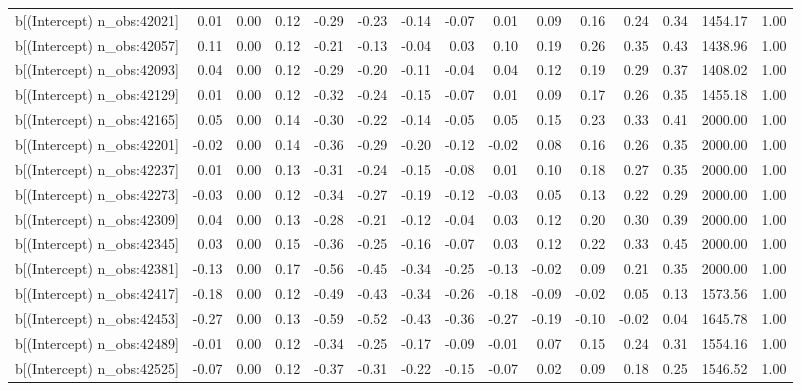 \begin{table}[ht]
\begin{tabular}{rrrrrrrrrrrrrrr}
  b[(Intercept) n\_obs:42021] & 0.01 & 0.00 & 0.12 & -0.29 & -0.23 & -0.14 & -0.07 & 0.01 & 0.09 & 0.16 & 0.24 & 0.34 & 1454.17 & 1.00 \\ 
  b[(Intercept) n\_obs:42057] & 0.11 & 0.00 & 0.12 & -0.21 & -0.13 & -0.04 & 0.03 & 0.10 & 0.19 & 0.26 & 0.35 & 0.43 & 1438.96 & 1.00 \\ 
  b[(Intercept) n\_obs:42093] & 0.04 & 0.00 & 0.12 & -0.29 & -0.20 & -0.11 & -0.04 & 0.04 & 0.12 & 0.19 & 0.29 & 0.37 & 1408.02 & 1.00 \\ 
  b[(Intercept) n\_obs:42129] & 0.01 & 0.00 & 0.12 & -0.32 & -0.24 & -0.15 & -0.07 & 0.01 & 0.09 & 0.17 & 0.26 & 0.35 & 1455.18 & 1.00 \\ 
  b[(Intercept) n\_obs:42165] & 0.05 & 0.00 & 0.14 & -0.30 & -0.22 & -0.14 & -0.05 & 0.05 & 0.15 & 0.23 & 0.33 & 0.41 & 2000.00 & 1.00 \\ 
  b[(Intercept) n\_obs:42201] & -0.02 & 0.00 & 0.14 & -0.36 & -0.29 & -0.20 & -0.12 & -0.02 & 0.08 & 0.16 & 0.26 & 0.35 & 2000.00 & 1.00 \\ 
  b[(Intercept) n\_obs:42237] & 0.01 & 0.00 & 0.13 & -0.31 & -0.24 & -0.15 & -0.08 & 0.01 & 0.10 & 0.18 & 0.27 & 0.35 & 2000.00 & 1.00 \\ 
  b[(Intercept) n\_obs:42273] & -0.03 & 0.00 & 0.12 & -0.34 & -0.27 & -0.19 & -0.12 & -0.03 & 0.05 & 0.13 & 0.22 & 0.29 & 2000.00 & 1.00 \\ 
  b[(Intercept) n\_obs:42309] & 0.04 & 0.00 & 0.13 & -0.28 & -0.21 & -0.12 & -0.04 & 0.03 & 0.12 & 0.20 & 0.30 & 0.39 & 2000.00 & 1.00 \\ 
  b[(Intercept) n\_obs:42345] & 0.03 & 0.00 & 0.15 & -0.36 & -0.25 & -0.16 & -0.07 & 0.03 & 0.12 & 0.22 & 0.33 & 0.45 & 2000.00 & 1.00 \\ 
  b[(Intercept) n\_obs:42381] & -0.13 & 0.00 & 0.17 & -0.56 & -0.45 & -0.34 & -0.25 & -0.13 & -0.02 & 0.09 & 0.21 & 0.35 & 2000.00 & 1.00 \\ 
  b[(Intercept) n\_obs:42417] & -0.18 & 0.00 & 0.12 & -0.49 & -0.43 & -0.34 & -0.26 & -0.18 & -0.09 & -0.02 & 0.05 & 0.13 & 1573.56 & 1.00 \\ 
  b[(Intercept) n\_obs:42453] & -0.27 & 0.00 & 0.13 & -0.59 & -0.52 & -0.43 & -0.36 & -0.27 & -0.19 & -0.10 & -0.02 & 0.04 & 1645.78 & 1.00 \\ 
  b[(Intercept) n\_obs:42489] & -0.01 & 0.00 & 0.12 & -0.34 & -0.25 & -0.17 & -0.09 & -0.01 & 0.07 & 0.15 & 0.24 & 0.31 & 1554.16 & 1.00 \\ 
  b[(Intercept) n\_obs:42525] & -0.07 & 0.00 & 0.12 & -0.37 & -0.31 & -0.22 & -0.15 & -0.07 & 0.02 & 0.09 & 0.18 & 0.25 & 1546.52 & 1.00 \\ 

\end{tabular}
\end{table}
